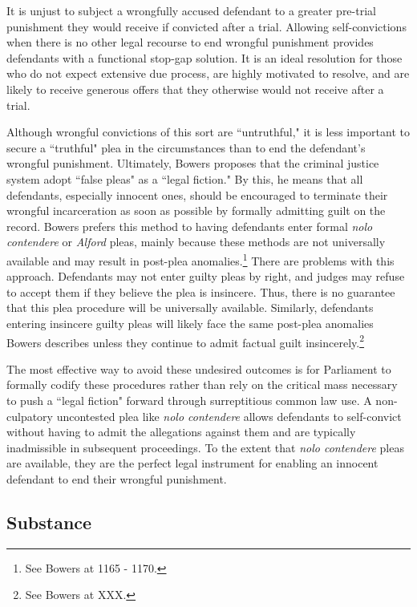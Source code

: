 It is unjust to subject a wrongfully accused defendant to a greater pre-trial punishment they would receive if convicted after a trial. Allowing self-convictions when there is no other legal recourse to end wrongful punishment provides defendants with a functional stop-gap solution. It is an ideal resolution for those who do not expect extensive due process, are highly motivated to resolve, and are likely to receive generous offers that they otherwise would not receive after a trial. 

Although wrongful convictions of this sort are ``untruthful," it is less important to secure a ``truthful" plea in the circumstances than to end the defendant's wrongful punishment. Ultimately, Bowers proposes that the criminal justice system adopt ``false pleas" as a ``legal fiction." By this, he means that all defendants, especially innocent ones, should be encouraged to terminate their wrongful incarceration as soon as possible by formally admitting guilt on the record. Bowers prefers this method to having defendants enter formal \textit{nolo contendere} or \textit{Alford} pleas, mainly because these methods are not universally available and may result in post-plea anomalies.\footnote{See Bowers at 1165 - 1170.} There are problems with this approach. Defendants may not enter guilty pleas by right, and judges may refuse to accept them if they believe the plea is insincere. Thus, there is no guarantee that this plea procedure will be universally available. Similarly, defendants entering insincere guilty pleas will likely face the same post-plea anomalies Bowers describes unless they continue to admit factual guilt insincerely.\footnote{See Bowers at XXX.} 

The most effective way to avoid these undesired outcomes is for Parliament to formally codify these procedures rather than rely on the critical mass necessary to push a ``legal fiction" forward through surreptitious common law use. A non-culpatory uncontested plea like \textit{nolo contendere} allows defendants to self-convict without having to admit the allegations against them and are typically inadmissible in subsequent proceedings. To the extent that \textit{nolo contendere} pleas are available, they are the perfect legal instrument for enabling an innocent defendant to end their wrongful punishment. 

\subsection{Substance}

